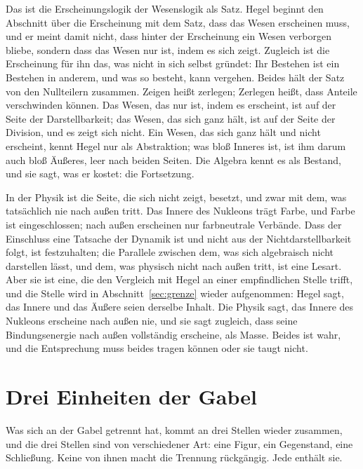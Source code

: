 \documentclass[11pt,a4paper]{article}
\newcommand{\Randlesart}{\marginpar{\raggedright\footnotesize\textcolor{lesart}{$\bigcirc$\,Lesart}}}
\begin{document}
\Randlesart Das ist die Erscheinungslogik der Wesenslogik als Satz. Hegel beginnt den Abschnitt über die Erscheinung mit dem Satz, dass das Wesen erscheinen muss, und er meint damit nicht, dass hinter der Erscheinung ein Wesen verborgen bliebe, sondern dass das Wesen nur ist, indem es sich zeigt. Zugleich ist die Erscheinung für ihn das, was nicht in sich selbst gründet: Ihr Bestehen ist ein Bestehen in anderem, und was so besteht, kann vergehen. Beides hält der Satz von den Nullteilern zusammen. Zeigen heißt zerlegen; Zerlegen heißt, dass Anteile verschwinden können. Das Wesen, das nur ist, indem es erscheint, ist auf der Seite der Darstellbarkeit; das Wesen, das sich ganz hält, ist auf der Seite der Division, und es zeigt sich nicht. Ein Wesen, das sich ganz hält und nicht erscheint, kennt Hegel nur als Abstraktion; was bloß Inneres ist, ist ihm darum auch bloß Äußeres, leer nach beiden Seiten. Die Algebra kennt es als Bestand, und sie sagt, was er kostet: die Fortsetzung.

In der Physik ist die Seite, die sich nicht zeigt, besetzt, und zwar mit dem, was tatsächlich nie nach außen tritt. Das Innere des Nukleons trägt Farbe, und Farbe ist eingeschlossen; nach außen erscheinen nur farbneutrale Verbände. Dass der Einschluss eine Tatsache der Dynamik ist und nicht aus der Nichtdarstellbarkeit folgt, ist festzuhalten; die Parallele zwischen dem, was sich algebraisch nicht darstellen lässt, und dem, was physisch nicht nach außen tritt, ist eine Lesart. Aber sie ist eine, die den Vergleich mit Hegel an einer empfindlichen Stelle trifft, und die Stelle wird in Abschnitt~\ref{sec:grenze} wieder aufgenommen: Hegel sagt, das Innere und das Äußere seien derselbe Inhalt. Die Physik sagt, das Innere des Nukleons erscheine nach außen nie, und sie sagt zugleich, dass seine Bindungsenergie nach außen vollständig erscheine, als Masse. Beides ist wahr, und die Entsprechung muss beides tragen können oder sie taugt nicht.

\section{Drei Einheiten der Gabel}
\label{sec:einheiten}

Was sich an der Gabel getrennt hat, kommt an drei Stellen wieder zusammen, und die drei Stellen sind von verschiedener Art: eine Figur, ein Gegenstand, eine Schließung. Keine von ihnen macht die Trennung rückgängig. Jede enthält sie.
\end{document}
